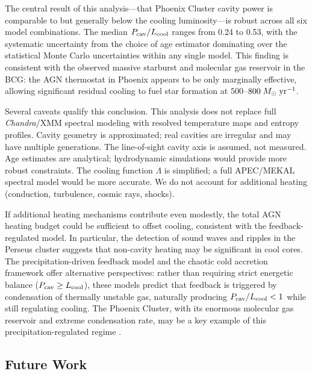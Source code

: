 \documentclass[twocolumn]{aastex63}
\newcommand{\Msun}{M_{\odot}}
\newcommand{\Lcool}{L_{\rm cool}}
\newcommand{\Pcav}{P_{\rm cav}}
\newcommand{\yr}{\rm yr}
\begin{document}
The central result of this analysis---that Phoenix Cluster cavity power is
comparable to but generally below the cooling luminosity---is robust across all
six model combinations. The median $\Pcav/\Lcool$ ranges from 0.24 to 0.53, with
the systematic uncertainty from the choice of age estimator dominating over the
statistical Monte Carlo uncertainties within any single model. This finding is
consistent with the observed massive starburst and molecular gas reservoir in the
BCG: the AGN thermostat in Phoenix appears to be only marginally effective,
allowing significant residual cooling to fuel star formation at
$500$--$800\;\Msun\;\yr^{-1}$.

Several caveats qualify this conclusion. This analysis does not replace full
\textit{Chandra}/XMM spectral modeling with resolved temperature maps and entropy
profiles. Cavity geometry is approximated; real cavities are irregular and may
have multiple generations. The line-of-sight cavity axis is assumed, not measured.
Age estimates are analytical; hydrodynamic simulations would provide more robust
constraints. The cooling function $\Lambda$ is simplified; a full APEC/MEKAL
spectral model would be more accurate. We do not account for additional heating
(conduction, turbulence, cosmic rays, shocks).

If additional heating mechanisms contribute even modestly, the total AGN heating
budget could be sufficient to offset cooling, consistent with the
feedback-regulated model. In particular, the detection of sound waves and ripples
in the Perseus cluster \citep{Fabian2006} suggests that non-cavity heating may be
significant in cool cores. The precipitation-driven feedback model
\citep{Voit2015} and the chaotic cold accretion framework \citep{Gaspari2013}
offer alternative perspectives: rather than requiring strict energetic balance
($\Pcav \geq \Lcool$), these models predict that feedback is triggered by
condensation of thermally unstable gas, naturally producing $\Pcav/\Lcool < 1$
while still regulating cooling. The Phoenix Cluster, with its enormous molecular
gas reservoir and extreme condensation rate, may be a key example of this
precipitation-regulated regime \citep{McDonald2018}.

\subsection{Future Work}
\label{sec:future}
\end{document}
